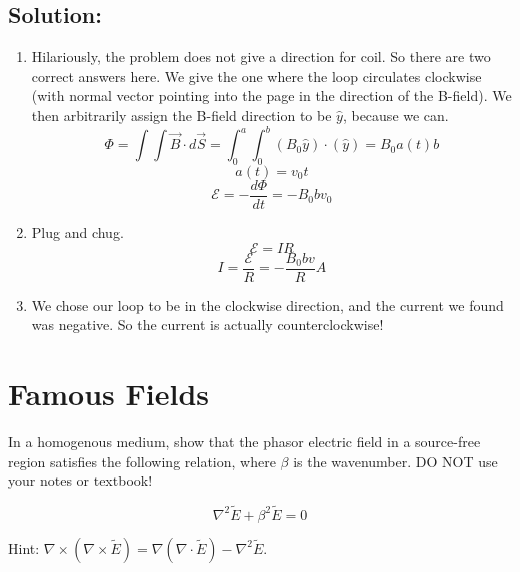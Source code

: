 \documentclass{article}
\begin{document}
\subsection{Solution:} 
\begin{enumerate}
    \item Hilariously, the problem does not give a direction for coil. So there are two correct answers here. We give the one where the loop circulates clockwise (with normal vector pointing into the page in the direction of the B-field). We then arbitrarily assign the B-field direction to be $\hat{y}$, because we can.
    \begin{equation}
            \Phi = \int \int \Vec{B} \cdot d\Vec{S} = \int_{0}^{a} \int_{0}^{b} (B_0 \hat{y}) \cdot (\hat{y})=B_0 a(t)b \nonumber
          \end{equation}
          \begin{equation}
            a(t) = v_0 t\nonumber
          \end{equation}
          \begin{equation}
            \mathcal{E}=-\frac{d\Phi}{dt} = -B_0 b v_0 \nonumber
          \end{equation}
    \item Plug and chug.
    \begin{equation}
            \mathcal{E}=IR \nonumber
          \end{equation}
          \begin{equation}
            I=\frac{\mathcal{E}}{R} = -\frac{B_0 b v}{R}A \nonumber
          \end{equation}
    \item We chose our loop to be in the clockwise direction, and the current we found was negative. So the current is actually counterclockwise!
\end{enumerate}

\newpage

\section{Famous Fields}

In a homogenous medium, show that the phasor electric field in a source-free region satisfies the following relation, where $\beta$ is the wavenumber. DO NOT use your notes or textbook!

\[
\nabla^2 \tilde{E} + \beta^2\tilde{E} = 0
\]

Hint: $\nabla\times(\nabla\times \tilde{E}) = \nabla(\nabla \cdot \tilde{E}) - \nabla^2 \tilde{E}$.
\end{document}
